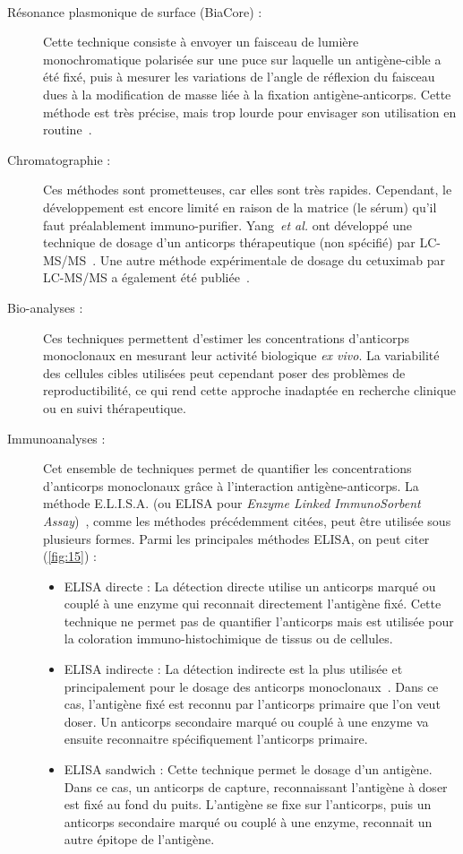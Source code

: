 \begin{description}
\item[Résonance plasmonique de surface (BiaCore\textsuperscript{\textregistered}) :] Cette technique consiste à envoyer un faisceau de lumière monochromatique polarisée sur une puce sur laquelle un antigène-cible a été fixé, puis à mesurer les variations de l'angle de réflexion du faisceau dues à la modification de masse liée à la fixation antigène-anticorps. Cette méthode est très précise, mais trop lourde pour envisager son utilisation en routine~\citep{REF92}.
\item[Chromatographie :] Ces méthodes sont prometteuses, car elles sont très rapides. Cependant, le développement est encore limité en raison de la matrice (le sérum) qu'il faut préalablement immuno-purifier. Yang~\textit{et al.} ont développé une technique de dosage d'un anticorps thérapeutique (non spécifié) par LC-MS/MS~\citep{REF93}. Une autre méthode expérimentale de dosage du cetuximab par LC-MS/MS a également été publiée~\citep{REF94}.
\item[Bio-analyses :] Ces techniques permettent d'estimer les concentrations d'anticorps monoclonaux en mesurant leur activité biologique \textit{ex vivo}. La variabilité des cellules cibles utilisées peut cependant poser des problèmes de reproductibilité, ce qui rend cette approche inadaptée en recherche clinique ou en suivi thérapeutique.
\item[Immunoanalyses : ] Cet ensemble de techniques permet de quantifier les concentrations d'anticorps monoclonaux grâce à l'interaction antigène-anticorps. La méthode E.L.I.S.A. (ou ELISA pour \textit{Enzyme Linked ImmunoSorbent Assay})~\citep{REF95}, comme les méthodes précédemment citées, peut être utilisée sous plusieurs formes. Parmi les principales méthodes ELISA, on peut citer (\ref{fig:15}) :
\begin{itemize}
\item ELISA directe : La détection directe utilise un anticorps marqué ou couplé à une enzyme qui reconnait directement l'antigène fixé. Cette technique ne permet pas de quantifier l'anticorps mais est utilisée pour la coloration immuno-histochimique de tissus ou de cellules.
\item ELISA indirecte : La détection indirecte est la plus utilisée et principalement pour le dosage des anticorps monoclonaux~\citep{REF96}. Dans ce cas, l'antigène fixé est reconnu par l'anticorps primaire que l'on veut doser. Un anticorps secondaire marqué ou couplé à une enzyme va ensuite reconnaitre spécifiquement l'anticorps primaire.
\item ELISA sandwich : Cette technique permet le dosage d'un antigène. Dans ce cas, un anticorps de capture, reconnaissant l'antigène à doser est fixé au fond du puits. L'antigène se fixe sur l'anticorps, puis un anticorps secondaire marqué ou couplé à une enzyme, reconnait un autre épitope de l'antigène.
\end{itemize}
\end{description}

